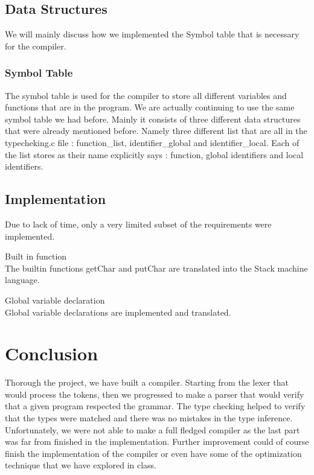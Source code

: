 \documentclass{article}
\begin{document}
\subsection{Data Structures}
We will mainly discuss how we implemented the Symbol table that is necessary for the compiler. 
\subsubsection{Symbol Table}
The symbol table is used for the compiler to store all different variables and functions that are in the program. We are actually continuing to use the same symbol table we had before. Mainly it consists of three different data structures that were already mentioned before. Namely three different list that are all in the typecheking.c file : function\_list, identifier\_global and identifier\_local. Each of the list stores as their name explicitly says : function, global identifiers and local identifiers. 

\subsection{Implementation}
Due to lack of time, only a very limited subset of the requirements were implemented. 
\label{definition}
\begin{description}
\item{Built in function}\\
The builtin functions getChar and putChar are translated into the Stack machine language. 
\item{Global variable declaration}\\
Global variable declarations are implemented and translated. 

\end{description}

\section{Conclusion}
Thorough the project, we have built a compiler. Starting from the lexer that would process the tokens, then we progressed to make a parser that would verify that a given program respected the grammar. The type checking helped to verify that the types were matched and there was no mistakes in the type inference. \\
Unfortunately, we were not able to make a full fledged compiler as the last part was far from finished in the implementation. Further improvement could of course finish the implementation of the compiler or even have some of the optimization technique that we have explored in class.
\end{document}
